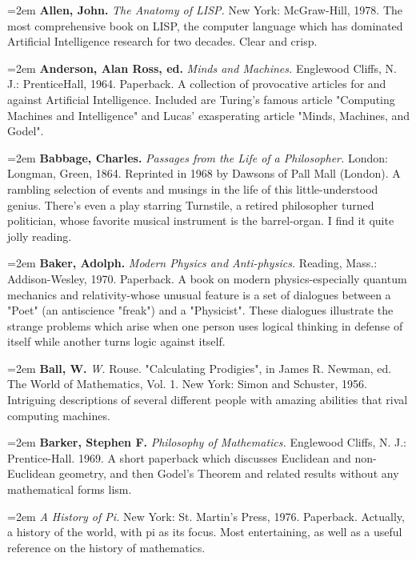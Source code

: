 \par\noindent\hangindent=2em {\bf Allen, John.} {\it The Anatomy of LISP.} New York: McGraw-Hill, 1978. The most comprehensive book on LISP, the computer language which has dominated Artificial Intelligence research for two decades. Clear and crisp.

\par\noindent\hangindent=2em {\bf Anderson, Alan Ross, ed.} {\it Minds and Machines.} Englewood Cliffs, N. J.: PrenticeHall, 1964. Paperback. A collection of provocative articles for and against Artificial Intelligence. Included are Turing's famous article "Computing Machines and Intelligence" and Lucas' exasperating article "Minds, Machines, and Godel".

\par\noindent\hangindent=2em {\bf Babbage, Charles.} {\it Passages from the Life of a Philosopher.} London: Longman, Green, 1864. Reprinted in 1968 by Dawsons of Pall Mall (London). A rambling selection of events and musings in the life of this little-understood genius. There's even a play starring Turnstile, a retired philosopher turned politician, whose favorite musical instrument is the barrel-organ. I find it quite jolly reading.

\par\noindent\hangindent=2em {\bf Baker, Adolph.} {\it Modern Physics and Anti-physics.} Reading, Mass.: Addison-Wesley, 1970. Paperback. A book on modern physics-especially quantum mechanics and relativity-whose unusual feature is a set of dialogues between a "Poet" (an antiscience "freak") and a "Physicist". These dialogues illustrate the strange problems which arise when one person uses logical thinking in defense of itself while another turns logic against itself.

\par\noindent\hangindent=2em {\bf Ball, W.} {\it W.} Rouse. "Calculating Prodigies", in James R. Newman, ed. The World of Mathematics, Vol. 1. New York: Simon and Schuster, 1956. Intriguing descriptions of several different people with amazing abilities that rival computing machines.

\par\noindent\hangindent=2em {\bf Barker, Stephen F.} {\it Philosophy of Mathematics.} Englewood Cliffs, N. J.: Prentice-Hall. 1969. A short paperback which discusses Euclidean and non-Euclidean geometry, and then Godel's Theorem and related results without any mathematical forms lism.

\par\noindent\hangindent=2em  {\it A History of Pi.} New York: St. Martin's Press, 1976. Paperback. Actually, a history of the world, with pi as its focus. Most entertaining, as well as a useful reference on the history of mathematics.

